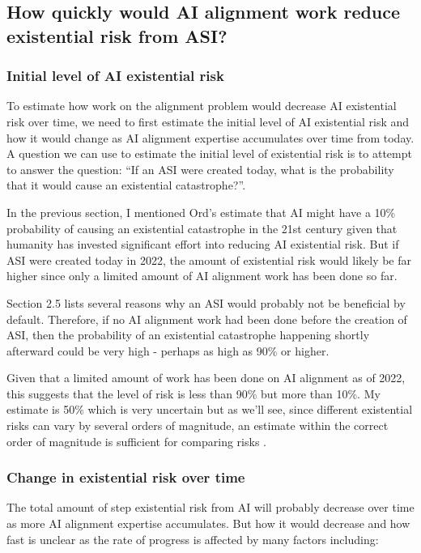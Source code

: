 \documentclass{article}
\begin{document}
\subsection{How quickly would AI alignment work reduce existential risk from ASI?}

\subsubsection{Initial level of AI existential risk}

To estimate how work on the alignment problem would decrease AI existential risk over time, we need to first estimate the initial level of AI existential risk and how it would change as AI alignment expertise accumulates over time from today. A question we can use to estimate the initial level of existential risk is to attempt to answer the question: “If an ASI were created today, what is the probability that it would cause an existential catastrophe?”.

In the previous section, I mentioned Ord’s estimate that AI might have a 10\% probability of causing an existential catastrophe in the 21st century given that humanity has invested significant effort into reducing AI existential risk. But if ASI were created today in 2022, the amount of existential risk would likely be far higher since only a limited amount of AI alignment work has been done so far.

Section 2.5 lists several reasons why an ASI would probably not be beneficial by default. Therefore, if no AI alignment work had been done before the creation of ASI, then the probability of an existential catastrophe happening shortly afterward could be very high - perhaps as high as 90\% or higher.

Given that a limited amount of work has been done on AI alignment as of 2022, this suggests that the level of risk is less than 90\% but more than 10\%. My estimate is 50\% which is very uncertain but as we’ll see, since different existential risks can vary by several orders of magnitude, an estimate within the correct order of magnitude is sufficient for comparing risks \cite{theprecipice}.

\subsubsection{Change in existential risk over time}

The total amount of step existential risk from AI will probably decrease over time as more AI alignment expertise accumulates. But how it would decrease and how fast is unclear as the rate of progress is affected by many factors including:
\end{document}
